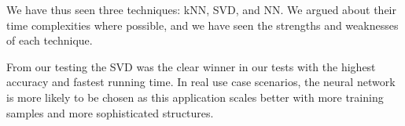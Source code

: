 We have thus seen three techniques: kNN, SVD, and NN.\@
We argued about their time complexities where possible, and we have seen the strengths and weaknesses of each technique.

From our testing the SVD was the clear winner in our tests with the highest accuracy and fastest running time.
In real use case scenarios, the neural network is more likely to be chosen as this application scales better with more training samples and more sophisticated structures.